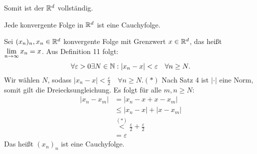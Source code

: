 \documentclass[../ana1.tex]{subfiles}
\begin{document}
Somit ist der \(\mathbb{R}^d\) vollständig.
\begin{lem}
	Jede konvergente Folge in \(\mathbb{R}^d\) ist eine Cauchyfolge.
\end{lem}
\begin{bew}
	Sei \((x_n)_n, x_n\in\mathbb{R}^d\) konvergente Folge mit Grenzwert \(x\in\mathbb{R}^d\), das heißt \(\lim\limits_{n\rightarrow\infty} x_n = x\). Aus Definition 11 folgt:
	\[\forall \varepsilon>0 \exists N\in\mathbb{N}: |x_n - x| < \varepsilon \quad\forall n\geq N.\]
	Wir wählen \(N\), sodass \(|x_n - x| < \frac{\varepsilon}{2} \quad\forall n\geq N. (*)\)
	Nach Satz 4 ist \(|\cdot|\) eine Norm, somit gilt die Dreiecksungleichung. Es folgt für alle \(m,n\geq N\):
	\begin{align*}
		|x_n - x_m| &= |x_n - x + x - x_m|\\
		&\leq |x_n - x| + |x  - x_m|\\
		&\overset{(*)}{<} \frac{\varepsilon}{2} + \frac{\varepsilon}{2}\\
		&= \varepsilon
	\end{align*}
	Das heißt \((x_n)_n\) ist eine Cauchyfolge.
\end{bew}
\end{document}
